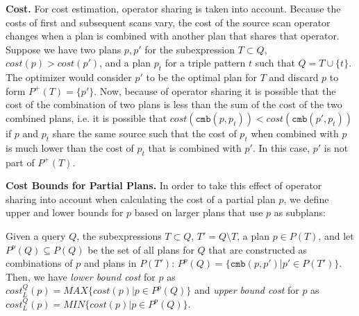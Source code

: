 \textbf{Cost.} For cost estimation, operator sharing is taken into
account. Because the costs of first and subsequent scans vary, the
cost of the source scan operator changes when a plan is combined with
another plan that shares that operator.
Suppose we have two plans $p,p'$ for the subexpression $T \subset Q$, $cost(p) > cost(p')$,
and a plan $p_t$ for a triple pattern $t$ such that $Q = T \cup
\{t\}$. The optimizer would consider $p'$ to
be the optimal plan for $T$ and discard $p$ to form
$P^+(T)=\{p'\}$. Now, because of operator sharing it is possible that
the cost of the combination of two plans is less than the sum of the
cost of the two combined plans, i.e. it is possible that
$cost(\mathtt{cmb}(p,p_t)) < cost(\mathtt{cmb}(p',p_t))$ if $p$ and
$p_t$ share the same source such that the cost of $p_t$ when combined
with $p$ is much lower than the cost of $p_t$ that is combined with
$p'$. In this case, $p'$ is not part of $P^+(T)$.


\textbf{Cost Bounds for Partial Plans.} In order to take this effect
of operator sharing into account when calculating the cost of a
partial plan $p$, we define upper and lower bounds for $p$ based on
larger plans that use $p$ as subplans:

\begin{definition}
  \label{def:bounds}
  Given a query $Q$, the subexpressions $T \subset Q$, $T' = Q
  \setminus T$, a plan $p \in P(T)$, and let $P^p(Q) \subseteq P(Q)$
  be the set of all plans for $Q$ that are constructed as combinations
  of $p$ and plans in $P(T')$: $P^p(Q) = \{\mathtt{cmb}(p,p') | p' \in
  P(T')\}$.  Then, we have \emph{lower bound cost} for $p$ as
  $cost_L^Q(p)= MAX\{cost(p)| p \in P^p(Q)\}$ and \emph{upper bound
    cost} for $p$ as $cost_L^Q(p)= MIN\{cost(p)| p \in P^p(Q)\}$.
\end{definition}

